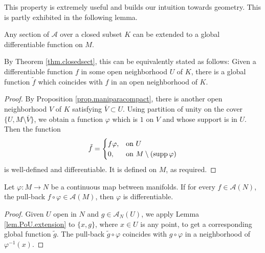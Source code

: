 This property is extremely useful and builds our intuition towards geometry. This is partly exhibited in the following lemma.

\begin{lemma}\label{lem.PoU.extension}
    Any section of $\mathcal{A}$ over a closed subset $K$ can be extended to a global differentiable function on $M$.

    By Theorem \ref{thm.closedsect}, this can be equivalently stated as follows: Given a differentiable function $f$ in some open neighborhood $U$ of $K$, there is a global function $\tilde f$ which coincides with $f$ in an open neighborhood of $K$.
\end{lemma}

\begin{proof}
    By Proposition \ref{prop.maniparacompact}, there is another open neighborhood $V$ of $K$ satisfying $\overline{V}\subset U$. Using partition of unity on the cover $\{U,M\setminus\overline{V}\}$, we obtain a function $\varphi$ which is $1$ on $V$ and whose support is in $U$. Then the function
    $$\tilde f=\begin{cases}
        f\varphi, & \text{on }U \\
        0, & \text{on }M\setminus(\operatorname{supp}\varphi)
    \end{cases}$$
    is well-defined and differentiable. It is defined on $M$, as required.
\end{proof}

\begin{proposition}
    Let $\varphi:M\to N$ be a continuous map between manifolds. If for every $f\in\mathcal{A}(N)$, the pull-back $f\circ\varphi\in\mathcal{A}(M)$, then $\varphi$ is differentiable.
\end{proposition}

\begin{proof}
    Given $U$ open in $N$ and $g\in\mathcal{A}_N(U)$, we apply Lemma \ref{lem.PoU.extension} to $\{x,g\}$, where $x\in U$ is any point, to get a corresponding global function $\tilde g$. The pull-back $\tilde g\circ\varphi$ coincides with $g\circ\varphi$ in a neighborhood of $\varphi^{-1}(x)$.
\end{proof}

